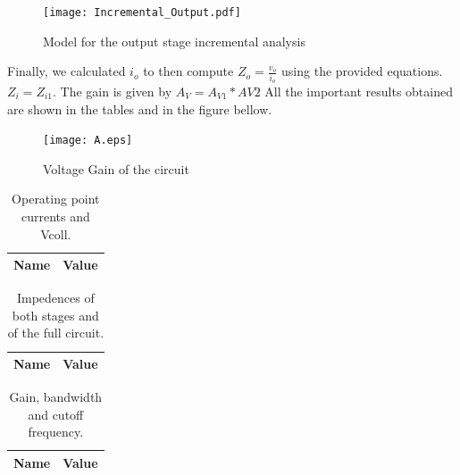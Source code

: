 \begin{figure}[h] \centering
\texttt{[image: Incremental\_Output.pdf]}
\caption{Model for the output stage incremental analysis}
\label{s}
\end{figure}



Finally, we calculated $i_o$ to then compute $Z_o=\frac{v_{o}}{i_o}$ using the provided equations. $Z_i=Z_{i1}$. The gain is given by $A_V = A_{V1}*{AV2}$
All the important results obtained are shown in the tables and in the figure bellow. 


\begin{figure}[h] \centering
\texttt{[image: A.eps]}
\caption{Voltage Gain of the circuit}
\label{sh}
\end{figure}


\begin{table}[ht]
  \centering
  \begin{tabular}{|l|r|}
    \hline    
    {\bf Name} & {\bf Value} \\ \hline
    
  \end{tabular}
  \caption{Operating point currents and Vcoll.}
  \label{tab:1}
\end{table}


\begin{table}[ht]
  \centering
  \begin{tabular}{|l|r|}
    \hline    
    {\bf Name} & {\bf Value} \\ \hline
    
  \end{tabular}
  \caption{Impedences of both stages and of the full circuit.}
  \label{tab:2}
\end{table}



\begin{table}[ht]
  \centering
  \begin{tabular}{|l|r|}
    \hline    
    {\bf Name} & {\bf Value} \\ \hline
    
  \end{tabular}
  \caption{Gain, bandwidth and cutoff frequency.}
  \label{tab:3}
\end{table}













